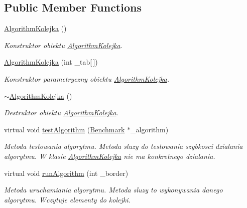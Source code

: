 \subsection*{Public Member Functions}
\begin{DoxyCompactItemize}
\item 
\hyperlink{class_algorithm_kolejka_a024b4d14ce3e46ad167fa1961168088e}{Algorithm\-Kolejka} ()
\begin{DoxyCompactList}\small\item\em Konstruktor obiektu \hyperlink{class_algorithm_kolejka}{Algorithm\-Kolejka}. \end{DoxyCompactList}\item 
\hyperlink{class_algorithm_kolejka_a734671abcf48ef75dd1df980b503e618}{Algorithm\-Kolejka} (int \-\_\-tab\mbox{[}$\,$\mbox{]})
\begin{DoxyCompactList}\small\item\em Konstruktor parametryczny obiektu \hyperlink{class_algorithm_kolejka}{Algorithm\-Kolejka}. \end{DoxyCompactList}\item 
\hyperlink{class_algorithm_kolejka_a1df769a80bf632f57437c8d0cf6874d2}{$\sim$\-Algorithm\-Kolejka} ()
\begin{DoxyCompactList}\small\item\em Destruktor obiektu \hyperlink{class_algorithm_kolejka}{Algorithm\-Kolejka}. \end{DoxyCompactList}\item 
virtual void \hyperlink{class_algorithm_kolejka_ac739a8c865d4b71232549d12e0f1f466}{test\-Algorithm} (\hyperlink{class_benchmark}{Benchmark} $\ast$\-\_\-algorithm)
\begin{DoxyCompactList}\small\item\em Metoda testowania algorytmu. Metoda sluzy do testowania szybkosci dzialania algorytmu. W klasie \hyperlink{class_algorithm_kolejka}{Algorithm\-Kolejka} nie ma konkretnego dzialania. \end{DoxyCompactList}\item 
virtual void \hyperlink{class_algorithm_kolejka_ae9da3f1862fd90feb4a3c1d6b4f3dd8d}{run\-Algorithm} (int \-\_\-border)
\begin{DoxyCompactList}\small\item\em Metoda uruchamiania algorytmu. Metoda sluzy to wykonywania danego algorytmu. Wczytuje elementy do kolejki. \end{DoxyCompactList}\end{DoxyCompactItemize}
